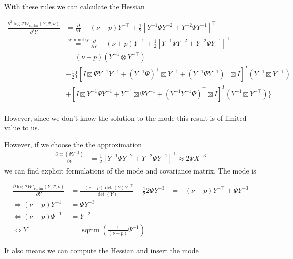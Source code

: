 With these rules we can calculate the Hessian

\begin{subequations}
\begin{align}
	\frac{\partial^2 \log \mathcal{IW}_{\text{sqrtm}}(Y, \Psi, \nu)}{\partial^2 Y} &= \frac{\partial}{\partial Y} -(\nu + p)Y^{-\top} + \frac{1}{2}[Y^{-1}\Psi Y^{-2} + Y^{-2}\Psi Y^{-1}]^\top \\ 
	&\overset{\text{symmetry}}{=}\frac{\partial}{\partial Y} -(\nu + p)Y^{-1} + \frac{1}{2}[Y^{-1}\Psi Y^{-2} + Y^{-2}\Psi Y^{-1}]^\top \\
	&= (\nu + p)(Y^{-1} \otimes Y^{-\top}) \\
	&- \frac{1}{2}\{[I \boxtimes \Psi Y^{-1}Y^{-1} + (Y^{-1}\Psi)^\top \boxtimes Y^{-1} + (Y^{-1}\Psi Y^{-1})^\top \boxtimes I]^T (Y^{-1} \boxtimes Y^{-\top}) \\
	&+ [I \boxtimes Y^{-1}\Psi Y^{-1} + Y^{-^\top} \boxtimes \Psi Y^{-1} + (Y^{-1}Y^{-1}\Psi)^\top \boxtimes I]^T (Y^{-1} \boxtimes Y^{-\top})\} \\
\end{align}
\end{subequations}

However, since we don't know the solution to the mode this result is of limited value to us. 

However, if we choose the the approximation 
\begin{align}
\frac{\partial \operatorname{tr}(\Psi Y^{-2})}{\partial Y} &= \frac{1}{2}[Y^{-1}\Psi Y^{-2} + Y^{-2}\Psi Y^{-1}]^\top \approx 2\Psi X^{-3}
\end{align}
we can find explicit formulations of the mode and covariance matrix. The mode is

\begin{subequations}
\begin{align}
\frac{\partial \log \mathcal{IW}'_{\text{sqrtm}}(Y, \Psi, \nu)}{\partial Y} &= \frac{-(\nu + p )\det(Y) Y^{-\top}}{\det(Y)} + \frac{1}{2} 2 \Psi Y^{-3}
&= -(\nu + p)Y^{-\top} + \Psi Y^{-3} \\
\Rightarrow (\nu + p)Y^{-1} &= \Psi Y^{-3} \\
\Leftrightarrow (\nu + p)\Psi^{-1} &= Y^{-2} \\
\Leftrightarrow Y &= \operatorname{sqrtm}\left(\frac{1}{(\nu+p)} \Psi^{-1}\right)
\end{align}
\end{subequations}

It also means we can compute the Hessian and insert the mode

